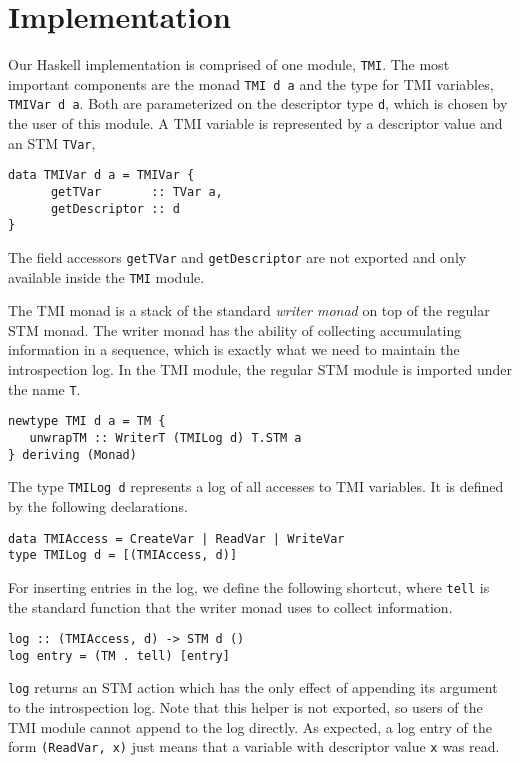 \section{Implementation}
\label{sec:implementation}

Our Haskell implementation is comprised of one module, \verb+TMI+. 
The most important components are the
monad \lstinline+TMI d a+ and the type for TMI variables, \lstinline+TMIVar d a+. 
Both are parameterized on the descriptor type \lstinline+d+, which is chosen by the user
of this module. A TMI variable is represented by a descriptor value and an STM \lstinline+TVar+,
\begin{lstlisting}[style=small]
data TMIVar d a = TMIVar {
      getTVar       :: TVar a,
      getDescriptor :: d
}
\end{lstlisting}
The field accessors \lstinline+getTVar+ and \lstinline+getDescriptor+ are not exported and
only available inside the \lstinline+TMI+ module.

The TMI monad is a stack of the standard {\em writer monad} on top of the regular STM
monad. The writer monad has the ability of collecting accumulating information in a
sequence, which is exactly what we need to maintain the introspection log.
In the TMI module, the regular STM module is imported under the name \lstinline+T+.
\begin{lstlisting}[style=small]
newtype TMI d a = TM {
   unwrapTM :: WriterT (TMILog d) T.STM a
} deriving (Monad)
\end{lstlisting}
The type \lstinline+TMILog d+ represents a log of all accesses to TMI variables.
It is defined by the following declarations.
\begin{lstlisting}[style=small]
data TMIAccess = CreateVar | ReadVar | WriteVar
type TMILog d = [(TMIAccess, d)]
\end{lstlisting}
For inserting entries in the log, we define the following shortcut, where \lstinline+tell+
is the standard function that the writer monad uses to collect information.
\begin{lstlisting}[style=small]
log :: (TMIAccess, d) -> STM d ()
log entry = (TM . tell) [entry]
\end{lstlisting}
\lstinline+log+ returns an STM action which has the
only effect of appending its argument to the introspection log. Note that this
helper is not exported, so users of the TMI module cannot append to the log
directly.
As expected, a log entry of the form \lstinline+(ReadVar, x)+ just means that a variable with descriptor
value \lstinline+x+ was read. 

